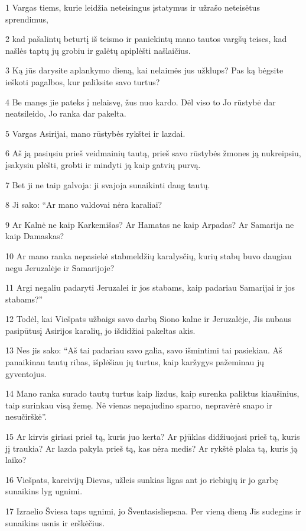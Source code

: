 \par 1 Vargas tiems, kurie leidžia neteisingus įstatymus ir užrašo neteisėtus sprendimus, 
\par 2 kad pašalintų beturtį iš teismo ir paniekintų mano tautos vargšų teises, kad našlės taptų jų grobiu ir galėtų apiplėšti našlaičius. 
\par 3 Ką jūs darysite aplankymo dieną, kai nelaimės jus užklups? Pas ką bėgsite ieškoti pagalbos, kur paliksite savo turtus? 
\par 4 Be manęs jie pateks į nelaisvę, žus nuo kardo. Dėl viso to Jo rūstybė dar neatsileido, Jo ranka dar pakelta. 
\par 5 Vargas Asirijai, mano rūstybės rykštei ir lazdai. 
\par 6 Aš ją pasiųsiu prieš veidmainių tautą, prieš savo rūstybės žmones ją nukreipsiu, įsakysiu plėšti, grobti ir mindyti ją kaip gatvių purvą. 
\par 7 Bet ji ne taip galvoja: ji svajoja sunaikinti daug tautų. 
\par 8 Ji sako: “Ar mano valdovai nėra karaliai? 
\par 9 Ar Kalnė ne kaip Karkemišas? Ar Hamatas ne kaip Arpadas? Ar Samarija ne kaip Damaskas? 
\par 10 Ar mano ranka nepasiekė stabmeldžių karalysčių, kurių stabų buvo daugiau negu Jeruzalėje ir Samarijoje? 
\par 11 Argi negaliu padaryti Jeruzalei ir jos stabams, kaip padariau Samarijai ir jos stabams?” 
\par 12 Todėl, kai Viešpats užbaigs savo darbą Siono kalne ir Jeruzalėje, Jis nubaus pasipūtusį Asirijos karalių, jo išdidžiai pakeltas akis. 
\par 13 Nes jis sako: “Aš tai padariau savo galia, savo išmintimi tai pasiekiau. Aš panaikinau tautų ribas, išplėšiau jų turtus, kaip karžygys pažeminau jų gyventojus. 
\par 14 Mano ranka surado tautų turtus kaip lizdus, kaip surenka paliktus kiaušinius, taip surinkau visą žemę. Nė vienas nepajudino sparno, nepravėrė snapo ir nesučirškė”. 
\par 15 Ar kirvis giriasi prieš tą, kuris juo kerta? Ar pjūklas didžiuojasi prieš tą, kuris jį traukia? Ar lazda pakyla prieš tą, kas nėra medis? Ar rykštė plaka tą, kuris ją laiko? 
\par 16 Viešpats, kareivijų Dievas, užleis sunkias ligas ant jo riebiųjų ir jo garbę sunaikins lyg ugnimi. 
\par 17 Izraelio Šviesa taps ugnimi, jo Šventasis­liepsna. Per vieną dieną Jis sudegins ir sunaikins usnis ir erškėčius. 
